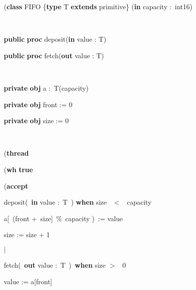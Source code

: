 \documentclass{article}%
\begin{document}
\begin{code}
(\textbf{class} FIFO \{\textbf{type} T \textbf{extends} primitive\}
(\textbf{in} capacity :\ int16)

\begin{indent}
\item ~

\item \textbf{public} \textbf{proc} deposit(\textbf{in} value : T)

\item \textbf{public} \textbf{proc} fetch(\textbf{out} value : T)

\item \ 

\item \textbf{private} \textbf{obj} a :\ T(capacity)

\item \textbf{private} \textbf{obj} front := 0

\item \textbf{private} \textbf{obj} size := 0

\item \ 

\item (\textbf{thread}

\begin{indent}
\item (\textbf{wh} \textbf{true}

\begin{indent}
\item (\textbf{accept}

\item \qquad deposit(\ \textbf{in} value :\ T\ ) \textbf{when} size\
$<$%
\ capacity

\item \qquad\qquad a[\ (front +\ size]\ \%\ capacity )\ := value

\item \qquad\qquad size := size + 1

\item
$\vert$%


\item \qquad fetch(\ \textbf{out} value :\ T\ )\ \textbf{when} size
$>$%
\ 0

\item \qquad\qquad value := a[front]


\end{indent}
\end{indent}
\end{indent}
\end{code}
\end{document}
